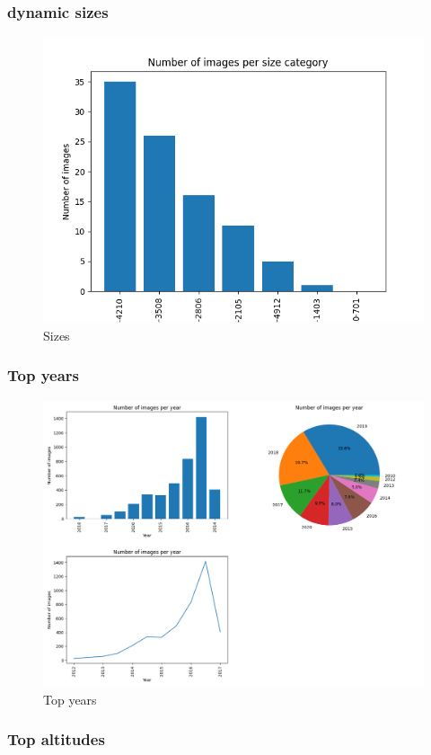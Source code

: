\documentclass{article}
\begin{document}
    \subsubsection{dynamic sizes}\label{subsubsec:dynamic_sizes}

    \begin{figure}[htbp]
        \centering
        \includegraphics[width=0.65 \textwidth]{img/size_dynamic}
        \caption{Sizes}
        \label{fig:dynamic_sizes}
    \end{figure}

    \newpage

    \subsubsection{Top years}\label{subsubsec:top_years}

    \begin{figure}[htbp]
        \centering
        \includegraphics[width=0.65 \textwidth]{img/year}
        \caption{Top years}
        \label{fig:top_years}
    \end{figure}

    \subsubsection{Top altitudes}\label{subsubsec:top_altitudes}
\end{document}
